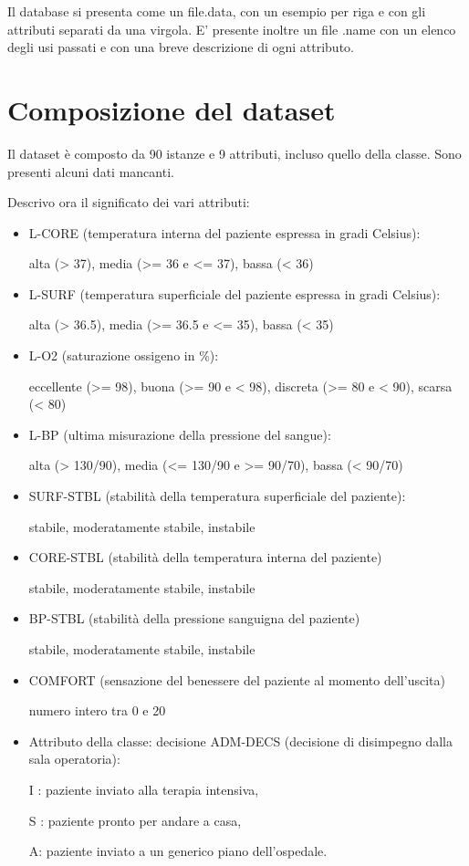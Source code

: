 \documentclass[a4paper, 12p]{report}
\begin{document}
Il database si presenta come un file.data, con un esempio per riga e con gli attributi  separati da una virgola. E' presente inoltre un file .name con un elenco degli usi passati e con una breve descrizione di ogni attributo.

\section{Composizione del dataset}
Il dataset è composto da 90 istanze e 9 attributi, incluso quello della classe. Sono presenti alcuni dati mancanti.

Descrivo ora il significato dei vari attributi:
\begin{itemize}

	\item L-CORE (temperatura interna del paziente espressa in gradi Celsius):
	
              alta (> 37), media (>= 36 e <= 37), bassa (< 36)
	\item L-SURF (temperatura superficiale del paziente espressa in gradi Celsius):
	
              alta (> 36.5), media (>= 36.5 e <= 35), bassa (< 35)
	\item L-O2 (saturazione ossigeno in \%):
	
              eccellente (>= 98), buona (>= 90 e < 98), discreta (>= 80 e < 90), scarsa (< 80)
	\item L-BP (ultima misurazione della pressione del sangue):
	
              alta (> 130/90), media (<= 130/90 e >= 90/70), bassa (< 90/70)
	\item SURF-STBL (stabilità della temperatura superficiale del paziente):
	
              stabile, moderatamente stabile, instabile
	\item CORE-STBL (stabilità della temperatura interna del paziente)
	
              stabile, moderatamente stabile, instabile
	\item  BP-STBL (stabilità della pressione sanguigna del paziente)
	
             stabile, moderatamente stabile, instabile
	\item COMFORT (sensazione del benessere del paziente al momento dell'uscita) 
	
	numero intero tra 0 e 20
	\item Attributo della classe: decisione ADM-DECS (decisione di disimpegno dalla sala operatoria):
	
              I : paziente inviato alla terapia intensiva,
							
              S : paziente pronto per andare a casa,
							
              A: paziente inviato a un generico piano dell'ospedale.
														
\end{itemize}
\end{document}
